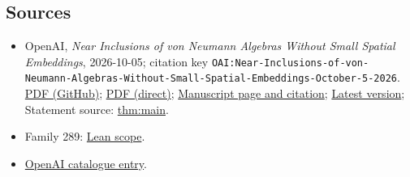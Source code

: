 \documentclass[11pt]{article}
\begin{document}
\subsection{Sources}
\begin{itemize}
\item OpenAI, \emph{Near Inclusions of von Neumann Algebras Without Small Spatial Embeddings}, 2026-10-05; citation key \texttt{OAI:Near-Inclusions-of-von-Neumann-Algebras-Without-Small-Spatial-Embeddings-October-5-2026}. \href{https://github.com/openai/math/blob/adc7f1241b42e322a6451854ab7e4b4c146bf78a/preprints/Near-Inclusions-of-von-Neumann-Algebras-Without-Small-Spatial-Embeddings-October-5-2026/near-inclusions.pdf}{PDF (GitHub)}; \href{https://github.com/openai/math/raw/adc7f1241b42e322a6451854ab7e4b4c146bf78a/preprints/Near-Inclusions-of-von-Neumann-Algebras-Without-Small-Spatial-Embeddings-October-5-2026/near-inclusions.pdf}{PDF (direct)}; \href{https://github.com/openai/math/blob/adc7f1241b42e322a6451854ab7e4b4c146bf78a/preprints/Near-Inclusions-of-von-Neumann-Algebras-Without-Small-Spatial-Embeddings-October-5-2026/README.md}{Manuscript page and citation}; \href{https://github.com/openai/math/blob/main/preprints/Near-Inclusions-of-von-Neumann-Algebras-Without-Small-Spatial-Embeddings-October-5-2026/near-inclusions.pdf}{Latest version}; Statement source: \href{https://github.com/openai/math/blob/adc7f1241b42e322a6451854ab7e4b4c146bf78a/preprints/Near-Inclusions-of-von-Neumann-Algebras-Without-Small-Spatial-Embeddings-October-5-2026/build/sections/introduction.tex\#L49}{thm:main}.
\item Family 289: \href{https://github.com/openai/math/blob/adc7f1241b42e322a6451854ab7e4b4c146bf78a/lean/docs/289.md}{Lean scope}.
\item \href{https://github.com/openai/math/blob/adc7f1241b42e322a6451854ab7e4b4c146bf78a/CONTENTS.md}{OpenAI catalogue entry}.
\end{itemize}
\end{document}
